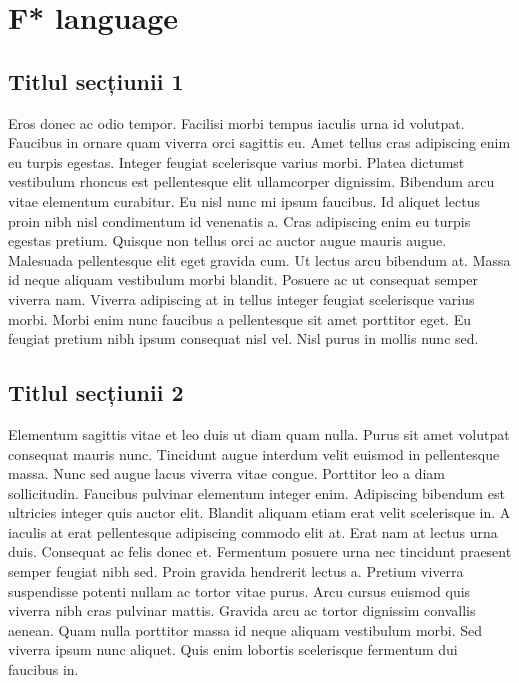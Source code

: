 \chapter{F* language}



\section{Titlul secțiunii 1}

Eros donec ac odio tempor. Facilisi morbi tempus iaculis urna id volutpat. Faucibus in ornare quam viverra orci sagittis eu. Amet tellus cras adipiscing enim eu turpis egestas. Integer feugiat scelerisque varius morbi. Platea dictumst vestibulum rhoncus est pellentesque elit ullamcorper dignissim. Bibendum arcu vitae elementum curabitur. Eu nisl nunc mi ipsum faucibus. Id aliquet lectus proin nibh nisl condimentum id venenatis a. Cras adipiscing enim eu turpis egestas pretium. Quisque non tellus orci ac auctor augue mauris augue. Malesuada pellentesque elit eget gravida cum. Ut lectus arcu bibendum at. Massa id neque aliquam vestibulum morbi blandit. Posuere ac ut consequat semper viverra nam. Viverra adipiscing at in tellus integer feugiat scelerisque varius morbi. Morbi enim nunc faucibus a pellentesque sit amet porttitor eget. Eu feugiat pretium nibh ipsum consequat nisl vel. Nisl purus in mollis nunc sed.

\section{Titlul secțiunii 2}

Elementum sagittis vitae et leo duis ut diam quam nulla. Purus sit amet volutpat consequat mauris nunc. Tincidunt augue interdum velit euismod in pellentesque massa. Nunc sed augue lacus viverra vitae congue. Porttitor leo a diam sollicitudin. Faucibus pulvinar elementum integer enim. Adipiscing bibendum est ultricies integer quis auctor elit. Blandit aliquam etiam erat velit scelerisque in. A iaculis at erat pellentesque adipiscing commodo elit at. Erat nam at lectus urna duis. Consequat ac felis donec et. Fermentum posuere urna nec tincidunt praesent semper feugiat nibh sed. Proin gravida hendrerit lectus a. Pretium viverra suspendisse potenti nullam ac tortor vitae purus. Arcu cursus euismod quis viverra nibh cras pulvinar mattis. Gravida arcu ac tortor dignissim convallis aenean. Quam nulla porttitor massa id neque aliquam vestibulum morbi. Sed viverra ipsum nunc aliquet. Quis enim lobortis scelerisque fermentum dui faucibus in.